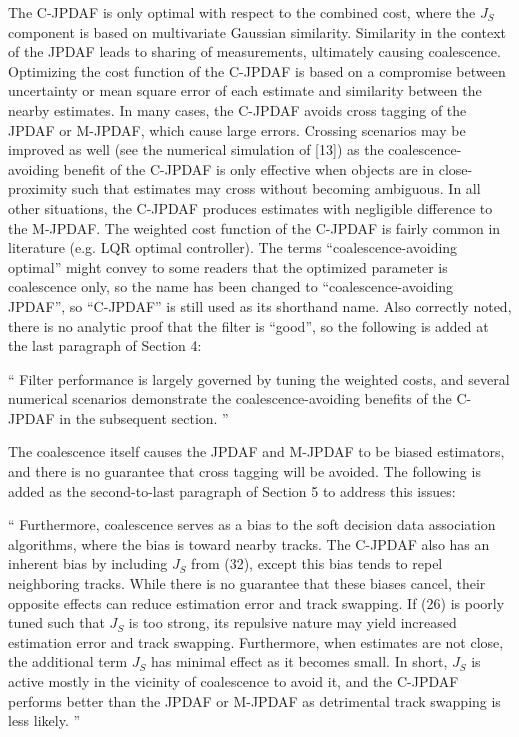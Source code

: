 \documentclass[11pt]{article}
\newenvironment{correction}{\begin{list}{}{\setlength{\leftmargin}{1cm}\setlength{\rightmargin}{1cm}}\vspace{\parsep}\item[]``}{''\end{list}}
\begin{document}
\begin{itemize}
The C-JPDAF is only optimal with respect to the combined cost, where the $J_S$ component is based on multivariate Gaussian similarity. Similarity in the context of the JPDAF leads to sharing of measurements, ultimately causing coalescence.
Optimizing the cost function of the C-JPDAF is based on a compromise between uncertainty or mean square error of each estimate and similarity between the nearby estimates. In many cases, the C-JPDAF avoids cross tagging of the JPDAF or M-JPDAF, which cause large errors. Crossing scenarios may be improved as well (see the numerical simulation of [13]) as the coalescence-avoiding benefit of the C-JPDAF is only effective when objects are in close-proximity such that estimates may cross without becoming ambiguous. In all other situations, the C-JPDAF produces estimates with negligible difference to the M-JPDAF. The weighted cost function of the C-JPDAF is fairly common in literature (e.g. LQR optimal controller).
The terms ``coalescence-avoiding optimal'' might convey to some readers that the optimized parameter is coalescence only, so the name has been changed to ``coalescence-avoiding JPDAF'', so ``C-JPDAF'' is still used as its shorthand name.
Also correctly noted, there is no analytic proof that the filter is ``good'', so the following is added at the last paragraph of Section 4:

\begin{correction}
Filter performance is largely governed by tuning the weighted costs, and several numerical scenarios demonstrate the coalescence-avoiding benefits of the C-JPDAF in the subsequent section.
\end{correction}

The coalescence itself causes the JPDAF and M-JPDAF to be biased estimators, and there is no guarantee that cross tagging will be avoided. 
The following is added as the second-to-last paragraph of Section 5 to address this issues:

\begin{correction}
Furthermore, coalescence serves as a bias to the soft decision data association algorithms, where the bias is toward nearby tracks. The C-JPDAF also has an inherent bias by including $J_S$ from (32), except this bias tends to repel neighboring tracks. While there is no guarantee that these biases cancel, their opposite effects can reduce estimation error and track swapping. If (26) is poorly tuned such that $J_S$ is too strong, its repulsive nature may yield increased estimation error and track swapping.
Furthermore, when estimates are not close, the additional term $J_S$ has minimal effect as it becomes small.
In short, $J_S$ is active mostly in the vicinity of coalescence to avoid it, and the C-JPDAF performs better than the JPDAF or M-JPDAF as detrimental track swapping is less likely.
\end{correction}


\end{itemize}
\end{document}
